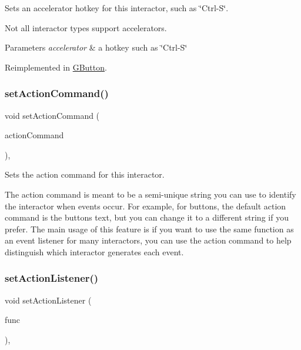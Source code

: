 Sets an accelerator hotkey for this interactor, such as \char`\"{}\+Ctrl-\/\+S\char`\"{}. 

Not all interactor types support accelerators. 
\begin{DoxyParams}{Parameters}
{\em accelerator} & a hotkey such as \char`\"{}\+Ctrl-\/\+S\char`\"{} \\
\hline
\end{DoxyParams}


Reimplemented in \mbox{\hyperlink{classGButton_a502f311e78e7531f8a7b50054ce91c85}{G\+Button}}.

\mbox{\label{classGInteractor_a4b5843fe3030e038a1ba54cc03389bcf}} 
\subsubsection{\texorpdfstring{set\+Action\+Command()}{setActionCommand()}}
{\footnotesize\ttfamily void set\+Action\+Command (\begin{DoxyParamCaption}\item[{const std\+::string \&}]{action\+Command }\end{DoxyParamCaption})\hspace{0.3cm}{\ttfamily [virtual]}, {\ttfamily [inherited]}}



Sets the action command for this interactor. 

The action command is meant to be a semi-\/unique string you can use to identify the interactor when events occur. For example, for buttons, the default action command is the button\textquotesingle{}s text, but you can change it to a different string if you prefer. The main usage of this feature is if you want to use the same function as an event listener for many interactors, you can use the action command to help distinguish which interactor generates each event. \mbox{\label{classGInteractor_adcfb4742430c88714fcf57e57ab8ea9c}} 
\subsubsection{\texorpdfstring{set\+Action\+Listener()}{setActionListener()}\hspace{0.1cm}{\footnotesize\ttfamily [1/2]}}
{\footnotesize\ttfamily void set\+Action\+Listener (\begin{DoxyParamCaption}\item[{G\+Event\+Listener}]{func }\end{DoxyParamCaption})\hspace{0.3cm}{\ttfamily [virtual]}, {\ttfamily [inherited]}}



